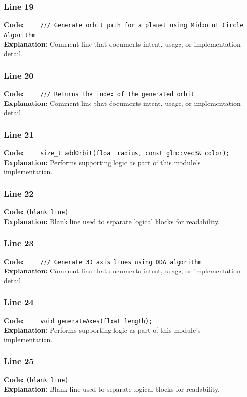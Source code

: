 \documentclass[11pt,a4paper]{article}
\begin{document}
\subsubsection*{Line 19}
\textbf{Code:} \verb|    /// Generate orbit path for a planet using Midpoint Circle Algorithm|\\
\textbf{Explanation:} Comment line that documents intent, usage, or implementation detail.

\subsubsection*{Line 20}
\textbf{Code:} \verb|    /// Returns the index of the generated orbit|\\
\textbf{Explanation:} Comment line that documents intent, usage, or implementation detail.

\subsubsection*{Line 21}
\textbf{Code:} \verb|    size_t addOrbit(float radius, const glm::vec3& color);|\\
\textbf{Explanation:} Performs supporting logic as part of this module's implementation.

\subsubsection*{Line 22}
\textbf{Code:} \texttt{(blank line)}\\
\textbf{Explanation:} Blank line used to separate logical blocks for readability.

\subsubsection*{Line 23}
\textbf{Code:} \verb|    /// Generate 3D axis lines using DDA algorithm|\\
\textbf{Explanation:} Comment line that documents intent, usage, or implementation detail.

\subsubsection*{Line 24}
\textbf{Code:} \verb|    void generateAxes(float length);|\\
\textbf{Explanation:} Performs supporting logic as part of this module's implementation.

\subsubsection*{Line 25}
\textbf{Code:} \texttt{(blank line)}\\
\textbf{Explanation:} Blank line used to separate logical blocks for readability.
\end{document}
